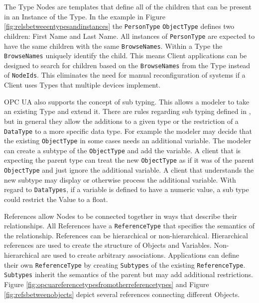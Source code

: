 The Type Nodes are templates that define all of the children that can be present in an Instance of the Type. In the example in Figure \ref{fig:relsbetweeentypesandinstances} the \texttt{PersonType} \texttt{ObjectType} defines two children: First Name and Last Name. All instances of \texttt{PersonType} are expected to have the same children with the same \texttt{BrowseNames}. Within a Type the \texttt{BrowseNames} uniquely identify the child. This means Client applications can be designed to search for children based on the \texttt{BrowseNames} from the Type instead of \texttt{NodeIds}. This eliminates the need for manual reconfiguration of systems if a Client uses Types that multiple devices implement.

OPC UA also supports the concept of sub typing. This allows a modeler to take an existing Type and extend it. There are rules regarding sub typing defined in \cite{UAPart3}, but in general they allow the additions to a given type or the restriction of a \texttt{DataType} to a more specific data type. For example the modeler may decide that the existing \texttt{ObjectType} in some cases needs an additional variable. The modeler can create a subtype of the \texttt{ObjectType} and add the variable. A client that is expecting the parent type can treat the new \texttt{ObjectType} as if it was of the parent \texttt{ObjectType} and just ignore the additional variable. A client that understands the new subtype may display or otherwise process the additional variable. With regard to \texttt{DataTypes}, if a variable is defined to have a numeric value, a sub type could restrict the Value to a float.


\FloatBarrier

References allow Nodes to be connected together in ways that describe their relationships. All References have a  \texttt{ReferenceType} that specifies the semantics of the relationship. References can be hierarchical or non-hierarchical. Hierarchical references are used to create the structure of Objects and Variables. Non-hierarchical are used to create arbitrary associations. Applications can define their own  \texttt{ReferenceType} by creating  \texttt{Subtypes} of the existing \texttt{ReferenceType}.  \texttt{Subtypes} inherit the semantics of the parent but may add additional restrictions. Figure \ref{fig:opcuareferencetypesfromotherreferencetypes} and Figure \ref{fig:refsbetweenobjects} depict several references connecting different Objects.

